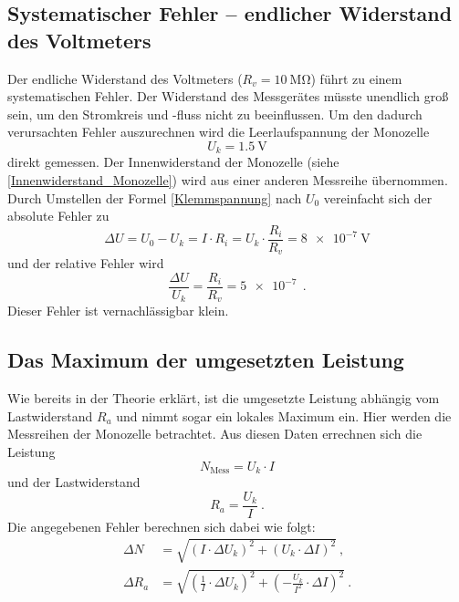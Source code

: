 \subsection{Systematischer Fehler -- endlicher Widerstand des Voltmeters}
\label{systhematischer_fehler}
Der endliche Widerstand des Voltmeters ($R_v = \SI{10}{\mega\ohm}$) führt zu einem systematischen Fehler. Der Widerstand des Messgerätes müsste unendlich groß sein, um den Stromkreis und -fluss nicht zu beeinflussen. Um den dadurch verursachten Fehler auszurechnen wird die Leerlaufspannung der Monozelle
\begin{equation}
U_k = \SI{1.5}{\volt}
\end{equation}
direkt gemessen.
Der Innenwiderstand der Monozelle (siehe \eqref{Innenwiderstand_Monozelle}) wird aus einer anderen Messreihe übernommen. Durch Umstellen der Formel \eqref{Klemmspannung} nach $U_0$ vereinfacht sich der absolute Fehler zu 
\begin{equation}
\Delta U = U_0 - U_k = I\cdot R_i = U_k \cdot \frac{R_i}{R_v} = \SI{8e-7}{\volt}
\end{equation}
und der relative Fehler wird 
\begin{equation}
\frac{\Delta U}{U_k} = \frac{R_i}{R_v} = \SI{5e-7}{} \ .
\end{equation}
Dieser Fehler ist vernachlässigbar klein.

\clearpage 
 
\subsection{Das Maximum der umgesetzten Leistung}
Wie bereits in der Theorie erklärt, ist die umgesetzte Leistung abhängig vom Lastwiderstand $R_a$ und nimmt sogar ein lokales Maximum ein. Hier werden die Messreihen der Monozelle betrachtet. Aus diesen Daten errechnen sich die Leistung \[ N_\text{Mess} = U_k \cdot I \] und der Lastwiderstand \[ R_a = \frac{U_k}{I} \ . \]
Die angegebenen Fehler berechnen sich dabei wie folgt:
\begin{align*}
	\Delta N &= \sqrt{\left(I\cdot\Delta U_k\right)^2+\left(U_k\cdot\Delta I\right)^2}\ , \\
	\Delta R_a &= \sqrt{\left(\frac{1}{I}\cdot\Delta U_k\right)^2+\left(-\frac{U_k}{I^2}\cdot\Delta I\right)^2}\ .
\end{align*}


